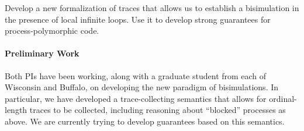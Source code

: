 \begin{goal}
  \label{goal:strong-epp}
  Develop a new formalization of traces that allows us to establish a bisimulation in the presence of local infinite loops.
  Use it to develop strong guarantees for process-polymorphic code.
\end{goal}

\paragraph{Preliminary Work}
Both PIs have been working, along with a graduate student from each of Wisconsin and Buffalo, on developing the new paradigm of bisimulations.
In particular, we have developed a trace-collecting semantics that allows for ordinal-length traces to be collected, including reasoning about ``blocked'' processes as above.
We are currently trying to develop guarantees based on this semantics.

